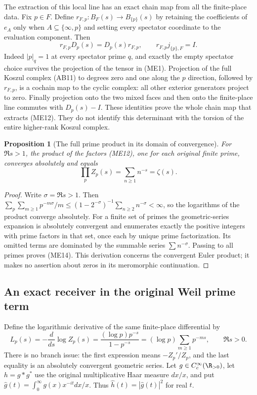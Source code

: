 \documentclass[11pt,a4paper]{article}
\newtheorem{proposition}[theorem]{Proposition}
\theoremstyle{definition}\newtheorem{definition}[theorem]{Definition}
\begin{document}
The extraction of this local line has an exact chain map from all the
finite-place data. Fix $p\in F$. Define
$r_{F,p}:B_F(s)\to B_{\{p\}}(s)$ by retaining the coefficients of
$e_A$ only when $A\subseteq\{\infty,p\}$ and setting every spectator
coordinate to the evaluation component. Then
\[
 r_{F,p}D_p(s)=D_p(s)r_{F,p},\qquad
 r_{F,p}j_{\{p\},F}=I.
 \tag{ME13}
\]
Indeed $|p|_q=1$ at every spectator prime $q$, and exactly the empty
spectator choice survives the projection of the tensor in (ME1).
Projection of the full Koszul complex (AB11) to degrees zero and one
along the $p$ direction, followed by $r_{F,p}$, is a cochain map to
the cyclic complex: all other exterior generators project to zero.
Finally projection onto the two mixed faces and then onto the finite-place
line commutes with $D_p(s)-I$. These identities prove the whole chain map
that extracts (ME12). They do not identify this determinant with the
torsion of the entire higher-rank Koszul complex.

\begin{proposition}[The full prime product in its domain of convergence]
For $\Re s>1$, the product of the factors (ME12), one for each original
finite prime, converges absolutely and equals
\[
 \prod_p Z_p(s)=\sum_{n\ge1}n^{-s}=\zeta(s).
 \tag{ME14}
\]
\end{proposition}
\begin{proof}
Write $\sigma=\Re s>1$. Then
$\sum_p\sum_{m\ge1}p^{-m\sigma}/m
\le(1-2^{-\sigma})^{-1}\sum_{n\ge2}n^{-\sigma}<\infty$,
so the logarithms of the product converge absolutely.
For a finite set of primes the geometric-series expansion is absolutely
convergent and enumerates exactly the positive integers with prime factors
in that set, once each by unique prime factorization. Its omitted terms
are dominated by the summable series $\sum n^{-\sigma}$. Passing to all
primes proves (ME14). This derivation concerns the convergent Euler
product; it makes no assertion about zeros in its meromorphic continuation.
\end{proof}

\subsection{An exact receiver in the original Weil prime term}
Define the logarithmic derivative of the same finite-place differential by
\[
 L_p(s)=-\frac{d}{ds}\log Z_p(s)
 =\frac{(\log p)p^{-s}}{1-p^{-s}}
 =(\log p)\sum_{m\ge1}p^{-ms},\qquad\Re s>0.
 \tag{ME15}\label{eq:ME-log-derivative}
\]
There is no branch issue: the first expression means $-Z_p'/Z_p$,
and the last equality is an absolutely convergent geometric series.
Let $g\in C_c^\infty(\R_{>0})$, let $h=g*g^*$ use the original
multiplicative Haar measure $dx/x$, and put
$\widehat g(t)=\int_0^\infty g(x)x^{-it}dx/x$. Thus
$\widehat h(t)=|\widehat g(t)|^2$ for real $t$.
\end{document}

